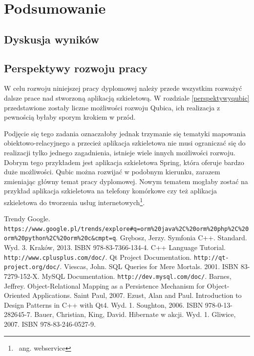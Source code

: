 \documentclass[12pt]{report}
\begin{document}
\chapter{Podsumowanie}
\label{podsumowanie}

\section{Dyskusja wyników}

\section{Perspektywy rozwoju pracy}

W celu rozwoju niniejszej pracy dyplomowej należy przede wszystkim rozważyć dalsze prace nad stworzoną aplikacją szkieletową. W rozdziale \ref{perspektywyqubic} przedstawione
zostały liczne możliwości rozwoju Qubica, ich realizacja z pewnością byłaby sporym krokiem w przód.

Podjęcie się tego zadania oznaczałoby jednak trzymanie się tematyki mapowania obiektowo-relacyjnego a przecież aplikacja szkieletowa nie musi ograniczać się do realizacji
tylko jednego zagadnienia, istnieje wiele innych możliwości rozwoju. Dobrym tego przykładem jest aplikacja szkieletowa Spring, która oferuje bardzo duże możliwości. Qubic można
rozwijać w podobnym kierunku, zarazem zmieniając główny temat pracy dyplomowej. Nowym tematem mogłaby zostać na przykład aplikacja szkieletowa na telefony
komórkowe czy też aplikacja szkieletowa do tworzenia usług internetowych\footnote{~ang. webservice}.

\begin{thebibliography}{99}
 Trendy Google. {\tt https://www.google.pl/trends/explore\#q=orm\%20\-java\%2C\%20orm\%20php\%2C\%20orm\%20python\%2C\%20orm\%20c\&cmpt=q}.
 Grębosz, Jerzy. Symfonia C++. Standard. Wyd. 3. Kraków, 2013. ISBN 978-83-7366-134-4.
 C++ Language Tutorial. {\tt http://www.cplusplus.com/doc/}.
Qt Project Documentation. {\tt http://qt-project.org/doc/}.
 Viescas, John. SQL Queries for Mere Mortals. 2001. ISBN 83-7279-152-X.
 MySQL Documentation. {\tt http://dev.mysql.com/doc/}.
 Barnes, Jeffrey. Object-Relational Mapping as a Persistence Mechanism for Object-Oriented Applications. Saint Paul, 2007.
 Ezust, Alan and Paul. Introduction to Design Patterns in C++ with Qt4. Wyd. 1. Soughton, 2006. ISBN 978-0-13-282645-7.
 Bauer, Christian, King, David. Hibernate w akcji. Wyd. 1. Gliwice, 2007. ISBN 978-83-246-0527-9.

\end{thebibliography}
\end{document}
